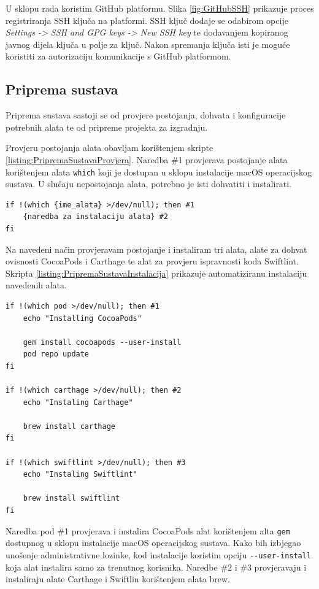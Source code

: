 \documentclass[times, utf8, diplomski, numeric]{fer}
\begin{document}
U sklopu rada koristim GitHub platformu. Slika \ref{fig:GitHubSSH} prikazuje proces registriranja SSH ključa na platformi. SSH ključ dodaje se odabirom opcije \textit{Settings -> SSH and GPG keys -> New SSH key} te dodavanjem kopiranog javnog dijela ključa u polje za ključ. Nakon spremanja ključa isti je moguće koristiti za autorizaciju komunikacije s GitHub platformom.

\subsection{Priprema sustava} \label{header:PripremaSustava}

Priprema sustava sastoji se od provjere postojanja, dohvata i konfiguracije potrebnih alata te od pripreme projekta za izgradnju.

Provjeru postojanja alata obavljam korištenjem skripte \ref{listing:PripremaSustavaProvjera}. Naredba \#1 provjerava postojanje alata korištenjem alata \verb|which| koji je dostupan u sklopu instalacije macOS operacijskog sustava. U slučaju nepostojanja alata, potrebno je isti dohvatiti i instalirati.

\begin{lstlisting}[caption=Provjera postojanja alata, label=listing:PripremaSustavaProvjera]
if !(which {ime_alata} >/dev/null); then #1
    {naredba za instalaciju alata} #2
fi
\end{lstlisting}

Na navedeni način provjeravam postojanje i instaliram tri alata, alate za dohvat ovisnosti CocoaPods i Carthage te alat za provjeru ispravnosti koda Swiftlint. Skripta \ref{listing:PripremaSustavaInstalacija} prikazuje automatiziranu instalaciju navedenih alata.


\begin{lstlisting}[caption=Automatizirana instalacija alata, label=listing:PripremaSustavaInstalacija]
if !(which pod >/dev/null); then #1
    echo "Installing CocoaPods"

    gem install cocoapods --user-install
    pod repo update
fi

if !(which carthage >/dev/null); then #2
    echo "Instaling Carthage"

    brew install carthage
fi

if !(which swiftlint >/dev/null); then #3
    echo "Instaling Swiftlint"

    brew install swiftlint
fi
\end{lstlisting}

Naredba pod \#1 provjerava i instalira CocoaPods alat korištenjem alta \verb|gem| dostupnog u sklopu instalacije macOS operacijskog sustava. Kako bih izbjegao unošenje administrativne lozinke, kod instalacije koristim opciju \verb|--user-install| koja alat instalira samo za trenutnog korisnika. Naredbe \#2 i \#3 provjeravaju i instaliraju alate Carthage i Swiftlin korištenjem alata brew.
\end{document}
